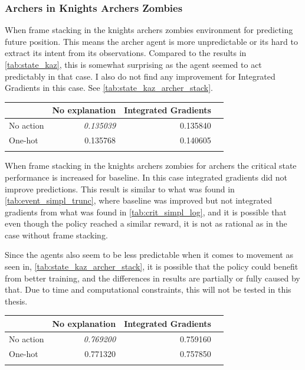 \documentclass[UKenglish]{uiomasterthesis}
\begin{document}
\subsubsection{Archers in Knights Archers Zombies}
\label{sec:kaz_exp3}

When frame stacking in the knights archers zombies environment for predicting future position. This means the archer agent is more unpredictable or its hard to extract its intent from its observations. Compared to the results in \cref{tab:state_kaz}, this is somewhat surprising as the agent seemed to act predictably in that case. I also do not find any improvement for Integrated Gradients in this case. See \cref{tab:state_kaz_archer_stack}.

\begin{center}
\label{tab:state_kaz_archer_stack}
\begin{tabular}{lrrr}
\toprule
 & No explanation & Integrated Gradients \\
\midrule
No action & \textit{0.135039} & 0.135840 \\
One-hot & 0.135768 & 0.140605 \\
\bottomrule
\addlinespace[2pt]
\multicolumn{3}{l}{\textsuperscript{***}$p<0.001$, 
  \textsuperscript{**}$p<0.01$, 
  \textsuperscript{*}$p<0.05$}
\end{tabular}
\end{center}

When frame stacking in the knights archers zombies for archers the critical state performance is increased for baseline. In this case integrated gradients did not improve predictions. This result is similar to what was found  in \cref{tab:event_simpl_trunc}, where baseline was improved but not integrated gradients from what was found in \cref{tab:crit_simpl_log}, and it is possible that even though the policy reached a similar reward, it is not as rational as in the case without frame stacking.

Since the agents also seem to be less predictable when it comes to movement as seen in, \cref{tab:state_kaz_archer_stack}, it is possible that the policy could benefit from better training, and the differences in results are partially or fully caused by that. Due to time and computational constraints, this will not be tested in this thesis.

\begin{center}
\label{tab:event_kaz_archer_stack}
\begin{tabular}{lrrr}
\toprule
 & No explanation & Integrated Gradients \\
\midrule
No action & \textit{0.769200} & 0.759160 \\
One-hot & 0.771320 & 0.757850 \\
\bottomrule
\addlinespace[2pt]
\multicolumn{3}{l}{\textsuperscript{***}$p<0.001$, 
  \textsuperscript{**}$p<0.01$, 
  \textsuperscript{*}$p<0.05$}
\end{tabular}
\end{center}
\end{document}
